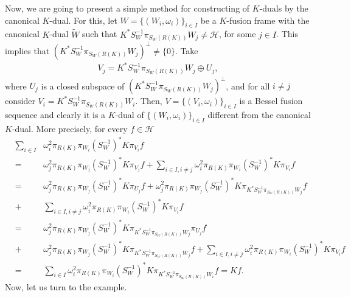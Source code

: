 \documentclass{birkjour}
\theoremstyle{definition}
\theoremstyle{remark}
\numberwithin{equation}{section}
\begin{document}
Now, we are going to present a simple method for constructing of  $K$-duals by the canonical $K$-dual. For this, let
$W = \lbrace (W_{i}, \omega_{i})\rbrace_{i\in I}$ be a $K$-fusion frame with the canonical $K$-dual $\widetilde{W}$ such that $K^{*}S_{W}^{-1}\pi_{S_{W}(R(K))}W_{j} \neq \mathcal{H}$, for some $j\in I$. This implies that
$(K^{*}S_{W}^{-1}\pi_{S_{W}(R(K))}W_{j})^{\perp} \neq \lbrace0\rbrace$. Take
\begin{eqnarray*}
V_{j} =
K^{*}S_{W}^{-1}\pi_{S_{W}(R(K))}W_{j}\oplus U_{j},
\end{eqnarray*}
  where $U_{j}$ is a closed subspace of $\left(K^{*}S_{W}^{-1}\pi_{S_{W}(R(K))}W_{j}\right)^{\perp}$, and for all $i \neq j$ consider   $V_{i} =
K^{*}S_{W}^{-1}\pi_{S_{W}(R(K))}W_{i}$. Then,  $V=\lbrace(V_{i},\omega_{i})\rbrace_{i\in I}$ is a Bessel fusion sequence
and clearly it
 is a $K$-dual of $\lbrace (W_{i}, \omega_{i})\rbrace_{i\in I}$ different  from the canonical $K$-dual. More precisely,  for every $f\in \mathcal{H}$
\begin{eqnarray*}
&\sum_{i\in I}&\omega_{i}^{2}\pi_{R(K)}\pi_{W_{i}}(S_{W}^{-1})^{*}K\pi_{V_{i}}f\\
&=&
\omega_{j}^{2}\pi_{R(K)}\pi_{W_{j}}(S_{W}^{-1})^{*}K\pi_{V_{j}} f
+ \sum_{i\in I, i\neq j}\omega_{i}^{2}\pi_{R(K)}\pi_{W_{i}}(S_{W}^{-1})^{*}K\pi_{V_{i}}f\\
&=& \omega_{j}^{2}\pi_{R(K)}\pi_{W_{j}}(S_{W}^{-1})^{*}K\pi_{U_{j}} f
+\omega_{j}^{2}\pi_{R(K)}\pi_{W_{j}}(S_{W}^{-1})^{*}K\pi_{K^{*}S_{W}^{-1}\pi_{S_{W}(R(K))}W_{j}}f\\
&+& \sum_{i\in I, i\neq j}\omega_{i}^{2}\pi_{R(K)}\pi_{W_{i}}(S_{W}^{-1})^{*}K\pi_{V_{i}}f\\
&=&\omega_{j}^{2}\pi_{R(K)}\pi_{W_{j}}(S_{W}^{-1})^{*}K\pi_{K^{*}S_{W}^{-1}\pi_{S_{W}(R(K))}W_{j}}\pi_{U_{j}}f\\
&+& \omega_{j}^{2}\pi_{R(K)}\pi_{W_{j}}(S_{W}^{-1})^{*}K\pi_{K^{*}S_{W}^{-1}\pi_{S_{W}(R(K))}W_{j}}f+ \sum_{i\in I, i\neq j}\omega_{i}^{2}\pi_{R(K)}\pi_{W_{i}}(S_{W}^{-1})^{*}K\pi_{V_{i}}f\\
&=& \sum_{i\in I}\omega_{i}^{2}\pi_{R(K)}\pi_{W_{i}}(S_{W}^{-1})^{*}K\pi_{K^{*}S_{W}^{-1}\pi_{S_{W}(R(K))}W_{i}}f=Kf.
\end{eqnarray*}
Now, let us turn to the example.
\end{document}
